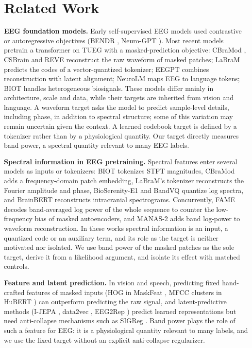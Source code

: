 \section{Related Work}\label{sec:related}
\noindent\textbf{EEG foundation models.} Early self-supervised EEG models used contrastive or
autoregressive objectives (BENDR \cite{kostas2021bendr}, Neuro-GPT \cite{cui2024neurogpt}).
Most recent models pretrain a transformer on TUEG with a masked-prediction objective: CBraMod
\cite{wang2025cbramod}, CSBrain \cite{csbrain} and REVE \cite{reve2025} reconstruct the raw
waveform of masked patches; LaBraM \cite{jiang2024labram} predicts the codes of a
vector-quantized tokenizer; EEGPT \cite{wang2024eegpt} combines reconstruction with latent
alignment; NeuroLM \cite{jiang2025neurolm} maps EEG to language tokens; BIOT
\cite{yang2023biot} handles heterogeneous biosignals. These models differ mainly in
architecture, scale and data, while their targets are inherited from vision and language. A
waveform target asks the model to predict sample-level details, including phase, in addition
to spectral structure; some of this variation may remain uncertain given the context. A
learned codebook target is defined by a tokenizer rather than by a physiological quantity. Our
target directly measures band power, a spectral quantity relevant to many EEG labels.

\noindent\textbf{Spectral information in EEG pretraining.} Spectral features enter several
models as inputs or tokenizers: BIOT tokenizes STFT magnitudes, CBraMod adds a
frequency-domain patch embedding, LaBraM's tokenizer reconstructs the Fourier amplitude and
phase, BioSerenity-E1 \cite{bettinardi2025bioserenity} and BandVQ \cite{sukhbaatar2026bandvq}
quantize log spectra, and BrainBERT \cite{wang2023brainbert} reconstructs intracranial
spectrograms. Concurrently, FAME \cite{yu2026fame} decodes band-averaged log power of the whole
sequence to counter the low-frequency bias of masked autoencoders, and MANAS-2
\cite{kulkarni2026manas2} adds band log-power to waveform reconstruction. In these works
spectral information is an input, a quantized code or an auxiliary term, and its role as the
target is neither motivated nor isolated. We use band power of the masked patches as the sole
target, derive it from a likelihood argument, and isolate its effect with matched controls.

\noindent\textbf{Feature and latent prediction.} In vision and speech, predicting fixed
hand-crafted features of masked inputs (HOG in MaskFeat \cite{wei2022maskfeat}, MFCC clusters in
HuBERT \cite{hsu2021hubert}) can outperform predicting the raw signal, and latent-predictive
methods (I-JEPA \cite{assran2023ijepa}, data2vec \cite{baevski2022data2vec}, EEG2Rep
\cite{foumani2024eeg2rep}) predict learned representations but need anti-collapse mechanisms
such as SIGReg \cite{balestriero2025lejepa}. Band power plays the role of such a feature for
EEG: it is a physiological quantity relevant to many labels, and we use the fixed target
without an explicit anti-collapse regularizer.
